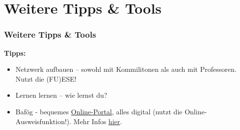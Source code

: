 \documentclass[10pt,a4paper]{beamer}
\begin{document}
    \section{Weitere Tipps \& Tools}
    \begin{frame}
        \frametitle{Weitere Tipps \& Tools}
        \textbf{Tipps:}
        \vfill
        \begin{itemize}
            \item Netzwerk aufbauen – sowohl mit Kommilitonen als auch mit Professoren. Nutzt die (FU)ESE!
            \vfill
            \item Lernen lernen – wie lernst du?
            \vfill
            \item Bafög - bequemes \href{https://www.bafoeg-digital.de/}{\color{ecs100}Online-Portal}, alles digital (nutzt die Online-Ausweisfunktion!). Mehr Infos \href{https://studierendenwerk-ulm.de/bafoeg-finanzen/}{\color{ecs100}hier}.
        \end{itemize}
        \vfill
    \end{frame}
\end{document}
